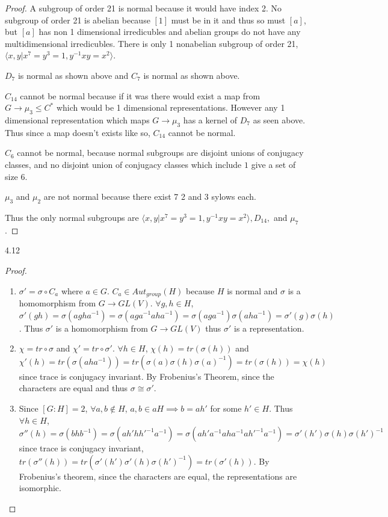\documentclass{article}
\newcommand{\angles}[1]{\langle #1 \rangle}
\begin{document}
\begin{proof}
    A subgroup of order 21 is normal because it would have index 2. No subgroup of order 21 is abelian because $[1]$ must be in it and thus so must $[a]$, but $[a]$ has non 1 dimensional irredicubles and abelian groups do not have any multidimensional irredicubles. There is only 1 nonabelian subgroup of order 21, $\angles{x, y | x^7 = y^3 = 1, y^{-1}xy = x^2}$. 

    $D_7$ is normal as shown above and $C_7$ is normal as shown above. 
    
    $C_{14}$ cannot be normal because if it was there would exist a map from $G \to \mu_3 \leq C^*$ which would be 1 dimensional representations. However any 1 dimensional representation which maps $G \to \mu_3$ has a kernel of $D_7$ as seen above. Thus since a map doesn't exists like so, $C_{14}$ cannot be normal. 
    
    
    $C_6$ cannot be normal, because normal subgroups are disjoint unions of conjugacy classes, and no disjoint union of conjugacy classes which include $1$ give a set of size 6.
    
    $\mu_3$ and $\mu_2$ are not normal because there exist 7 2 and 3 sylows each. 
    
    Thus the only normal subgroups are $\angles{x, y | x^7 = y^3 = 1, y^{-1}xy = x^2}, D_{14},$ and $\mu_7$.  
\end{proof}

\bigskip

\begin{PROB}{4.12}\label{Problem 4.12.}
\end{PROB}
\begin{proof}
    \begin{enumerate}
        \item $\sigma' = \sigma \circ C_a$ where $a \in G$. $C_a \in Aut_{group}(H)$ because $H$ is normal and $\sigma$ is a homomorphism from $G \to GL(V)$. $\forall g, h \in H$, $\sigma'(gh) = \sigma(agha^{-1}) = \sigma(aga^{-1}aha^{-1}) = \sigma(aga^{-1})\sigma(aha^{-1}) = \sigma'(g)\sigma(h)$. Thus $\sigma'$ is a homomorphism from $G \to GL(V)$ thus $\sigma'$ is a representation. 
        \item $\chi = tr \circ \sigma$ and $\chi' = tr \circ \sigma'$. $\forall h \in H$, $\chi(h) = tr(\sigma(h))$ and $\chi'(h) = tr(\sigma(aha^{-1})) = tr(\sigma(a)\sigma(h)\sigma(a)^{-1}) = tr(\sigma(h)) = \chi(h)$ since trace is conjugacy invariant. By Frobenius's Theorem, since the characters are equal and thus $\sigma \cong \sigma'$. 
        \item Since $[G : H] = 2$, $\forall a, b \not \in H$, $a, b \in aH \implies b = ah'$ for some $h' \in H$. Thus $\forall h \in H$, $\sigma''(h) = \sigma(bhb^{-1}) = \sigma(ah' h h'^{-1} a^{-1})= \sigma(ah'a^{-1} a h a^{-1} a h'^{-1} a^{-1}) = \sigma'(h')\sigma(h)\sigma(h')^{-1}$ since trace is conjugacy invariant, $tr(\sigma''(h)) = tr(\sigma'(h')\sigma'(h)\sigma(h')^{-1}) = tr(\sigma'(h))$. By Frobenius's theorem, since the characters are equal, the representations are isomorphic.    
    \end{enumerate}
\end{proof}
\end{document}
